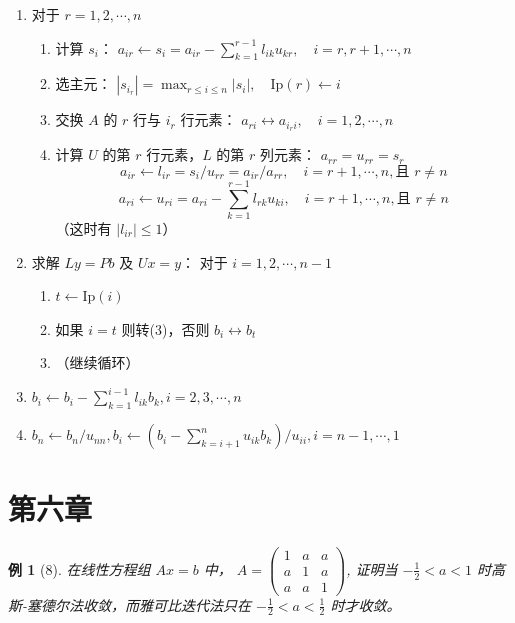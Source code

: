 \documentclass[a4paper,12pt]{ctexart}
\theoremstyle{exampleStyle}
\newtheorem*{example}{例}
\begin{document}
\begin{enumerate}[label=\textbf{\arabic*.}]
    \item 对于 $r = 1, 2, \cdots, n$
    \begin{enumerate}[label=(\arabic*)]
        \item 计算 $s_i$：
        $a_{ir} \leftarrow s_i = a_{ir} - \sum_{k=1}^{r-1} l_{ik} u_{kr}, \quad i = r, r+1, \cdots, n$
        \item 选主元：
        $|s_{i_r}| = \max_{r \leqslant i \leqslant n} |s_i|, \quad \text{Ip}(r) \leftarrow i$
        \item 交换 $A$ 的 $r$ 行与 $i_r$ 行元素：
        $a_{ri} \longleftrightarrow a_{i_r i}, \quad i = 1, 2, \cdots, n$
        \item 计算 $U$ 的第 $r$ 行元素，$L$ 的第 $r$ 列元素：
        $a_{rr} = u_{rr} = s_r$
        \[
        a_{ir} \leftarrow l_{ir} = s_i / u_{rr} = a_{ir} / a_{rr}, \quad i = r+1, \cdots, n, \text{且 } r \neq n
        \]
        \[
        a_{ri} \leftarrow u_{ri} = a_{ri} - \sum_{k=1}^{r-1} l_{rk} u_{ki}, \quad i = r+1, \cdots, n, \text{且 } r \neq n
        \]
        （这时有 $|l_{ir}| \leqslant 1$）
    \end{enumerate}

    \item 求解 $Ly = Pb$ 及 $Ux = y$：
    对于 $i = 1, 2, \cdots, n-1$
    \begin{enumerate}[label=(\arabic*)]
        \item $t \leftarrow \text{Ip}(i)$
        \item 如果 $i=t$ 则转(3)，否则 $b_i \longleftrightarrow b_t$
        \item （继续循环）
    \end{enumerate}
    \item $b_i \leftarrow b_i - \sum_{k=1}^{i-1} l_{ik} b_k, i = 2, 3, \cdots, n$
    \item $b_n \leftarrow b_n / u_{nn}, b_i \leftarrow (b_i - \sum_{k=i+1}^n u_{ik} b_k) / u_{ii}, i = n-1, \cdots, 1$
\end{enumerate}

\section*{第六章}

\begin{example}[8]
在线性方程组 $Ax = b$ 中，
$A = \begin{pmatrix} 1 & a & a \\ a & 1 & a \\ a & a & 1 \end{pmatrix}$,
证明当 $-\frac{1}{2} < a < 1$ 时高斯-塞德尔法收敛，而雅可比迭代法只在 $-\frac{1}{2} < a < \frac{1}{2}$ 时才收敛。
\end{example}
\end{document}
